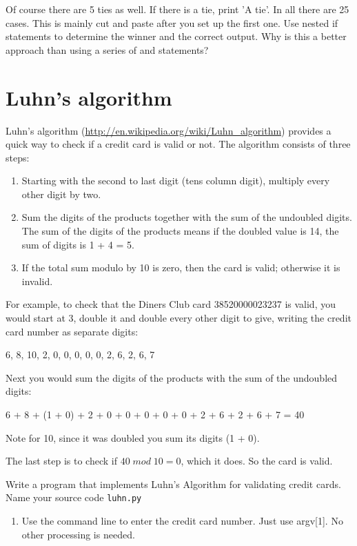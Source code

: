 \documentclass[12pt]{article}
\begin{document}
\begin{enumerate}
\begin{enumerate}
Of course there are 5 ties as well. If there is a tie, print 'A tie'. In all there are 25 cases. This is mainly cut and paste after you set up the first one. Use nested if statements to determine the winner and the correct output. Why is this a better approach than using a series of and statements?


\end{enumerate}


\section*{Luhn's algorithm}

Luhn's algorithm (\url{http://en.wikipedia.org/wiki/Luhn_algorithm}) provides a quick
  way to check if a credit card is valid or not. The algorithm consists
  of three steps:

\begin{enumerate}
\item Starting with the second to last digit (tens column digit), multiply
  every other digit by two.
\item Sum the digits of the products together with the sum of the
  undoubled digits. The sum of the digits of the products means if the
  doubled value is 14, the sum of digits is 1 + 4 = 5.
\item If the total sum modulo by 10 is zero, then the card is valid;
  otherwise it is invalid.
\end{enumerate}

For example, to check that the Diners Club card 38520000023237 is
valid, you would start at 3, double it and double every other digit to
give, writing the credit card number as separate digits: 

6, 8, 10, 2, 0, 0, 0, 0, 0, 2, 6, 2, 6, 7

Next you would sum the digits of the products with the sum of the
undoubled digits: 

6 + 8 + (1 + 0) + 2 + 0 + 0 + 0 + 0 + 0 + 2 + 6 + 2 + 6 + 7  =  40 

Note for 10, since it was doubled you sum its digits (1 + 0).

The last step is to check if $40 \; mod \; 10 = 0$, which it does. So the card is valid.

Write a program that implements Luhn's Algorithm for validating credit
cards. Name your source code \texttt{luhn.py}

\begin{enumerate}


  \item Use the command line to enter the credit card number. Just use argv[1]. No other processing is needed.


\end{enumerate}
\end{enumerate}
\end{document}
